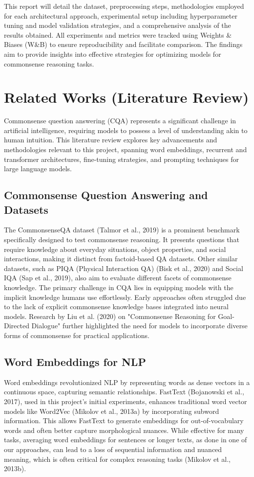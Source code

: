 \documentclass[10.5pt]{article}
\begin{document}
This report will detail the dataset, preprocessing steps, methodologies employed for each architectural approach, experimental setup including hyperparameter tuning and model validation strategies, and a comprehensive analysis of the results obtained. All experiments and metrics were tracked using Weights \& Biases (W\&B) to ensure reproducibility and facilitate comparison. The findings aim to provide insights into effective strategies for optimizing models for commonsense reasoning tasks.

\section{Related Works (Literature Review)}
Commonsense question answering (CQA) represents a significant challenge in artificial intelligence, requiring models to possess a level of understanding akin to human intuition. This literature review explores key advancements and methodologies relevant to this project, spanning word embeddings, recurrent and transformer architectures, fine-tuning strategies, and prompting techniques for large language models.

\subsection{Commonsense Question Answering and Datasets}
The CommonsenseQA dataset (Talmor et al., 2019) is a prominent benchmark specifically designed to test commonsense reasoning. It presents questions that require knowledge about everyday situations, object properties, and social interactions, making it distinct from factoid-based QA datasets. Other similar datasets, such as PIQA (Physical Interaction QA) (Bisk et al., 2020) and Social IQA (Sap et al., 2019), also aim to evaluate different facets of commonsense knowledge. The primary challenge in CQA lies in equipping models with the implicit knowledge humans use effortlessly. Early approaches often struggled due to the lack of explicit commonsense knowledge bases integrated into neural models. Research by Liu et al. (2020) on "Commonsense Reasoning for Goal-Directed Dialogue" further highlighted the need for models to incorporate diverse forms of commonsense for practical applications.

\subsection{Word Embeddings for NLP}
Word embeddings revolutionized NLP by representing words as dense vectors in a continuous space, capturing semantic relationships. FastText (Bojanowski et al., 2017), used in this project's initial experiments, enhances traditional word vector models like Word2Vec (Mikolov et al., 2013a) by incorporating subword information. This allows FastText to generate embeddings for out-of-vocabulary words and often better capture morphological nuances. While effective for many tasks, averaging word embeddings for sentences or longer texts, as done in one of our approaches, can lead to a loss of sequential information and nuanced meaning, which is often critical for complex reasoning tasks (Mikolov et al., 2013b).
\end{document}
